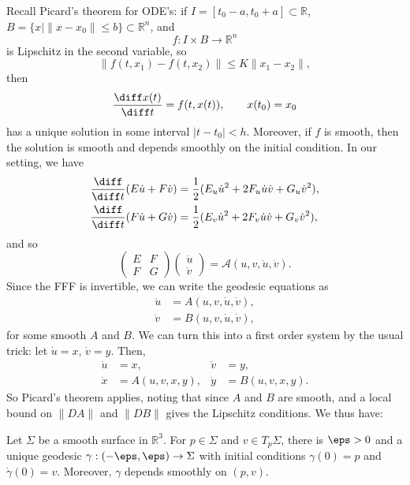 \documentclass[12pt]{article}
\begin{document}
Recall Picard's theorem for ODE's: if $I = [t_0 - a, t_0 + a] \subset \mathbb{R}$, $B = \{x \mid \|x - x_0\| \leq b \} \subset \mathbb{R}^{n}$, and
\[
f : I \times B \to \mathbb{R}^{n}
\]
is Lipschitz in the second variable, so
\[
\|f(t, x_1) - f(t, x_2)\| \leq K\|x_1 - x_2\|,
\]
then
\[
\frac{\diff x(t)}{\diff t} = f(t, x(t)), \qquad x(t_0) = x_0
\]
has a unique solution in some interval $|t - t_0| < h$. Moreover, if $f$ is smooth, then the solution is smooth and depends smoothly on the initial condition. In our setting, we have
\begin{align*}
	\frac{\diff}{\diff t}(E \dot u + F \dot v) &= \frac{1}{2} (E_u \dot u^2 + 2 F_u \dot u \dot v + G_u \dot v^2), \\
	\frac{\diff}{\diff t}(F \dot u + G \dot v) &= \frac{1}{2} (E_v \dot u^2 + 2 F_v \dot u \dot v + G_v \dot v^2), \\
\end{align*}
and so
\[
\begin{pmatrix}
	E & F \\ F & G
\end{pmatrix}
\begin{pmatrix}
	\ddot u \\ \ddot v
\end{pmatrix}
 = \mathcal{A}(u, v, \dot u, \dot v).
\]
Since the FFF is invertible, we can write the geodesic equations as
\begin{align*}
	\ddot u &= A(u, v, \dot u, \dot v), \\
	\ddot v &= B(u, v, \dot u, \dot v),
\end{align*}
for some smooth $A$ and $B$. We can turn this into a first order system by the usual trick: let $\dot u = x$, $\dot v = y$. Then,
\begin{align*}
	\dot u &= x, & \dot v &= y, \\
	\dot x &= A(u,v,x,y), & \dot y &= B(u, v, x, y).
\end{align*}
So Picard's theorem applies, noting that since $A$ and $B$ are smooth, and a local bound on $\|DA\|$ and $\|DB\|$ gives the Lipschitz conditions. We thus have:

\begin{corollary}
	Let $\Sigma$ be a smooth surface in $\mathbb{R}^3$. For $p \in \Sigma$ and $v \in T_p\Sigma$, there is $\eps > 0$ and a unique geodesic $\gamma : (-\eps, \eps) \to \Sigma$ with initial conditions $\gamma(0) = p$ and $\dot \gamma(0) = v$. Moreover, $\gamma$ depends smoothly on $(p, v)$.
\end{corollary}
\end{document}
